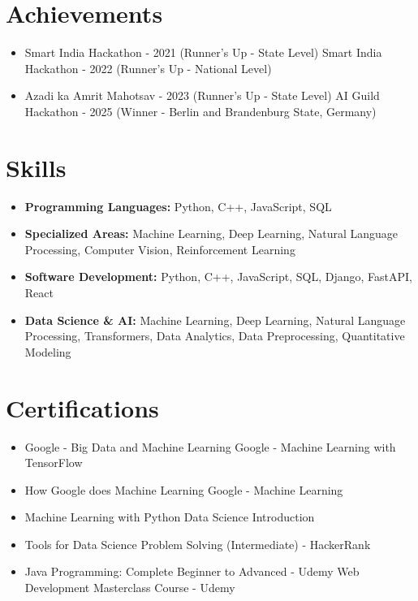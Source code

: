 \documentclass[a4paper,10pt]{article}
\begin{document}
\section*{Achievements}
\begin{itemize}
\item Smart India Hackathon - 2021 (Runner's Up - State Level) \hfill Smart India Hackathon - 2022 (Runner's Up - National Level)
\item Azadi ka Amrit Mahotsav - 2023 (Runner's Up - State Level) \hfill AI Guild Hackathon - 2025 (Winner - Berlin and Brandenburg State, Germany)
\end{itemize}

\section*{Skills}
\begin{itemize}
  \item \textbf{Programming Languages:} Python, C++, JavaScript, SQL
  \item \textbf{Specialized Areas:} Machine Learning, Deep Learning, Natural Language Processing, Computer Vision, Reinforcement Learning
  \item \textbf{Software Development:} Python, C++, JavaScript, SQL, Django, FastAPI, React
  \item \textbf{Data Science \& AI:} Machine Learning, Deep Learning, Natural Language Processing, Transformers, Data Analytics, Data Preprocessing, Quantitative Modeling
\end{itemize}

\section*{Certifications}
\begin{itemize}
\item Google - Big Data and Machine Learning \hfill Google - Machine Learning with TensorFlow
\item How Google does Machine Learning \hfill Google - Machine Learning
\item Machine Learning with Python \hfill Data Science Introduction
\item Tools for Data Science \hfill Problem Solving (Intermediate) - HackerRank
\item Java Programming: Complete Beginner to Advanced - Udemy \hfill Web Development Masterclass Course - Udemy
\end{itemize}
\end{document}
